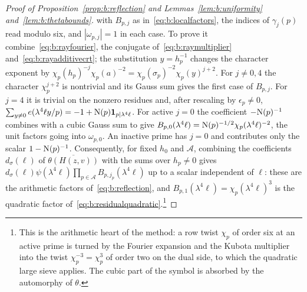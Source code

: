 \begin{proof}[Proof of Proposition~\ref{prop:b:reflection} and Lemmas~\ref{lem:b:uniformity} and~\ref{lem:b:thetabounds}]
with $B_{p,j}$ as in~\eqref{eq:b:localfactors}, the indices of $\gamma_j(p)$ read modulo six, and $|\omega_{p,j}|=1$ in each case. To prove it combine~\eqref{eq:b:rayfourier}, the conjugate of~\eqref{eq:b:raymultiplier} and~\eqref{eq:b:rayadditivecrt}; the substitution $y=h_p^{-1}$ changes the character exponent by $\chi_p(h_p)^{-j}\chi_p(a)^{-2}=\chi_p(\sigma_p)^{-2}\chi_p(y)^{j+2}$. For $j\ne0,4$ the character $\chi_p^{j+2}$ is nontrivial and its Gauss sum gives the first case of $B_{p,j}$. For $j=4$ it is trivial on the nonzero residues and, after rescaling by $\epsilon_p\ne0$, $\sum_{y\ne0}e(\lambda^4\ell y/p)=-1+\mathrm{N}(p)\mathbf{1}_{p\mid\lambda^4\ell}$. For active $j=0$ the coefficient $-\mathrm{N}(p)^{-1}$ combines with a cubic Gauss sum to give $B_{p,0}(\lambda^4\ell)=\mathrm{N}(p)^{-1/2}\chi_p(\lambda^4\ell)^{-2}$, the unit factors going into $\omega_{p,0}$. An inactive prime has $j=0$ and contributes only the scalar $1-\mathrm{N}(p)^{-1}$. Consequently, for fixed $h_0$ and $\mathcal A$, combining the coefficients $d_\sigma(\ell)$ of $\overline{\theta(H(z,v))}$ with the sums over $h_p\ne0$ gives $d_\sigma(\ell)\psi(\lambda^4\ell)\prod_{p\in\mathcal A}B_{p,j_p}(\lambda^4\ell)$ up to a scalar independent of $\ell$: these are the arithmetic factors of~\eqref{eq:b:reflection}, and $B_{p,1}(\lambda^4\ell)=\chi_p(\lambda^4\ell)^3$ is the quadratic factor of~\eqref{eq:b:residualquadratic}.\footnote{This is the arithmetic heart of the method: a row twist $\chi_p$ of order six at an active prime is turned by the Fourier expansion and the Kubota multiplier into the twist $\chi_p^{-3}=\chi_p^3$ of order two on the dual side, to which the quadratic large sieve applies. The cubic part of the symbol is absorbed by the automorphy of $\theta$.}


\end{proof}
